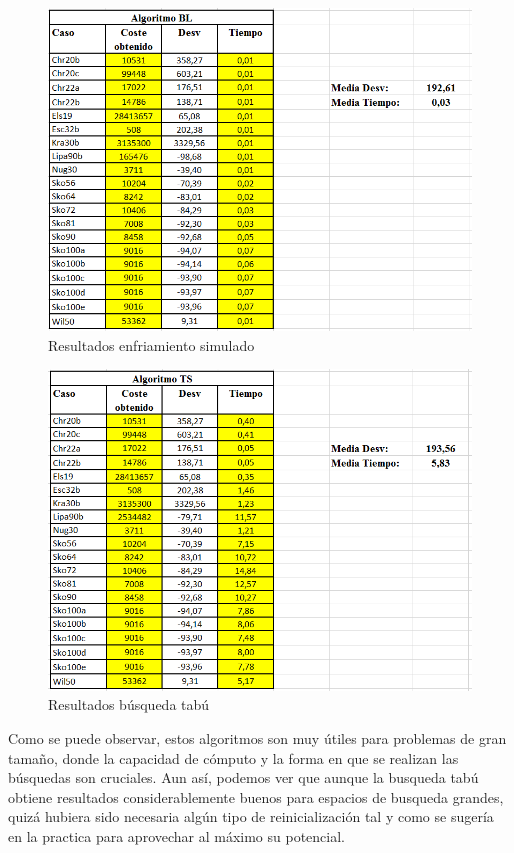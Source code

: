 	\begin{figure}[H]
		\centering
		\includegraphics[scale=1.0]{Screenshot_1.png}
		\caption{Resultados enfriamiento simulado}
		\label{}
	\end{figure}

	\begin{figure}[H]
		\centering
		\includegraphics[scale=1.0]{Screenshot_6.png}
		\caption{Resultados búsqueda tabú}
		\label{}
	\end{figure}

Como se puede observar, estos algoritmos son muy útiles para problemas de gran tamaño, donde la capacidad de cómputo y la forma en que se realizan las búsquedas son cruciales. Aun así, podemos ver que aunque la busqueda tabú obtiene resultados considerablemente buenos para espacios de busqueda grandes, quizá hubiera sido necesaria algún tipo de reinicialización tal y como se sugería en la practica para aprovechar al máximo su potencial.

